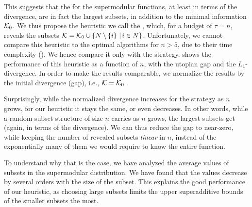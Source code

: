 This suggests that the  for the supermodular functions, at least in terms of the divergence, are in fact the largest subsets, in addition to the minimal information $ \mathcal{K}_0 $.
We thus propose the heuristic we call the \algLC{}, which, for a budget of $ \tau = n $, reveals the subsets $ \mathcal{K} = \mathcal{K}_0 \cup \left\{ N \setminus \left\{ i \right\} \,|\, i \in N \right\} $.
Unfortunately, we cannot compare this heuristic to the optimal algorithms for $ n > 5 $,  due to their time complexity ().
We hence compare it only with the \algRand{} strategy.
 shows the performance of this heuristic as a function of $ n $, with the utopian gap and the $ L_1 $-divergence.
In order to make the results comparable, we normalize the results by the initial divergence (gap), i.e., $ \mathcal{K} = \mathcal{K}_0 $ .

Surprisingly, while the normalized divergence increases for the \algRand{} strategy as $ n $ grows, for our \algLC{} heuristic it stays the same, or even decreases.
In other words, while a random subset structure of size $ n $ carries  as $n$ grows, the largest subsets get  (again, in terms of the divergence).
We can thus reduce the gap to near-zero, while keeping the number of revealed subsets \emph{linear} in $ n $, instead of the exponentially many of them we would require to know the entire function.

To understand why that is the case, we have analyzed the average values of subsets in the supermodular distribution.
We have found that the  values decrease by several orders with the size of the subset.
This explains the good performance of our heuristic, as choosing large subsets limits the upper superadditive bounds of the smaller subsets the most.
